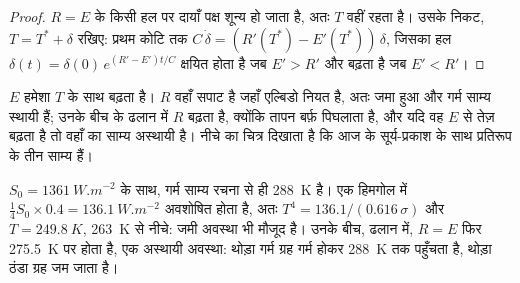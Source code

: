 \begin{proof}
$R = E$ के किसी हल पर दायाँ पक्ष शून्य हो जाता है, अतः $T$ वहीं रहता है। उसके निकट, $T = T^*
+ \delta$ रखिए: प्रथम कोटि तक $C\,\dot\delta = (R'(T^*) - E'(T^*))\,\delta$, जिसका हल
$\delta(t) = \delta(0)\,e^{(R' - E')t/C}$ क्षयित होता है जब $E' > R'$ और बढ़ता है जब $E' < R'$।
\end{proof}

$E$ हमेशा $T$ के साथ बढ़ता है। $R$ वहाँ सपाट है जहाँ एल्बिडो नियत है, अतः जमा हुआ और गर्म
साम्य स्थायी हैं; उनके बीच के ढलान में $R$ बढ़ता है, क्योंकि तापन बर्फ़ पिघलाता है, और यदि वह
$E$ से तेज़ बढ़ता है तो वहाँ का साम्य अस्थायी है। नीचे का चित्र दिखाता है कि आज के
सूर्य-प्रकाश के साथ प्रतिरूप के तीन साम्य हैं।

\begin{example}[आज के सूर्य के नीचे तीन जलवायु]\label{ex:b2:precambrian-earth:three}
$S_0 = \qty{1361}{W.m^{-2}}$ के साथ, गर्म साम्य रचना से ही \qty{288}{K} है। एक
हिमगोल में $\tfrac14 S_0\times0.4 = \qty{136.1}{W.m^{-2}}$ अवशोषित होता है, अतः $T^4 =
136.1/(0.616\,\sigma)$ और $T = \qty{249.8}{K}$, \qty{263}{K} से नीचे: जमी अवस्था भी
मौजूद है। उनके बीच, ढलान में, $R = E$ फिर \qty{275.5}{K} पर होता है, एक अस्थायी अवस्था:
थोड़ा गर्म ग्रह गर्म होकर \qty{288}{K} तक पहुँचता है, थोड़ा ठंडा ग्रह जम जाता है।
\end{example}

